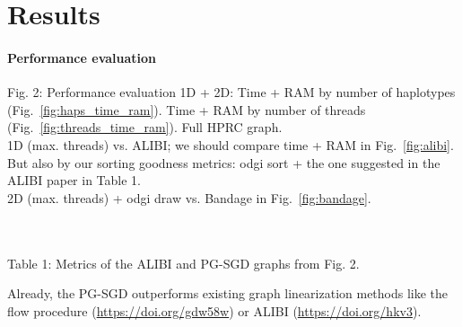 \documentclass{bioinfo}
\theoremstyle{definition}
\begin{document}
    

    \iffalse
    Fig. 1: Describe how our approach works, especially a single update operation (Fig. \ref{fig:sketches}). Explanation of 1D graph updating in Figures \ref{fig:1d_before_update}-\ref{fig:1d_after_update}. Explanation of 2D graph updating in Figures \ref{fig:2d_before_update}-\ref{fig:2d_after_update}. Zipfian distribution.

    
    \fi

    \iffalse


    \section{Results}
    \label{sec:results}




    \paragraph{Performance evaluation}
    Fig. 2: Performance evaluation 1D + 2D: Time + RAM by number of haplotypes (Fig.~\ref{fig:haps_time_ram}). Time + RAM by number of threads (Fig.~\ref{fig:threads_time_ram}). Full HPRC graph.
    \\
    1D (max. threads) vs. ALIBI; we should compare time + RAM in Fig.~\ref{fig:alibi}.
    But also by our sorting goodness metrics: odgi sort + the one suggested in the ALIBI paper in Table 1.
    \\
    2D (max. threads) + odgi draw vs. Bandage in Fig.~\ref{fig:bandage}.
    
    \\
    \\
    Table 1: Metrics of the ALIBI and PG-SGD graphs from Fig. 2.
    
    Already, the PG-SGD outperforms existing graph linearization methods like the flow procedure (\url{https://doi.org/gdw58w}) or ALIBI (\url{https://doi.org/hkv3}).
\end{document}
